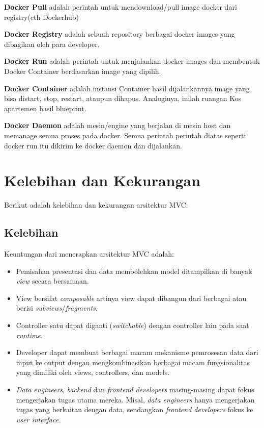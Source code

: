 \textbf{Docker Pull} adalah perintah untuk mendownload/pull image docker dari registry(cth Dockerhub)

\textbf{Docker Registry} adalah sebuah repository berbagai docker images yang dibagikan oleh para developer.

\textbf {Docker Run} adalah perintah untuk menjalankan docker images dan membentuk Docker Container berdasarkan image yang dipilih.

\textbf {Docker Container} adalah instansi Container hasil dijalankannya image yang bisa distart, stop, restart, ataupun dihapus. Analoginya, inilah ruangan Kos apartemen hasil blueprint.

\textbf {Docker Daemon} adalah mesin/engine yang berjalan di mesin host dan memanage semua proses pada docker. Semua perintah perintah diatas seperti docker run itu dikirim ke docker daemon dan dijalankan.

\section{Kelebihan dan Kekurangan}
Berikut adalah kelebihan dan kekurangan arsitektur MVC:


\subsection{Kelebihan}
Keuntungan dari menerapkan arsitektur MVC adalah:
\begin{itemize}
\item Pemisahan presentasi dan data membolehkan model ditampilkan di banyak \textit{view} secara bersamaan.
\item View bersifat \textit{composable} artinya view dapat dibangun dari berbagai atau berisi \textit{subviews}/\textit{fragments}.
\item Controller satu dapat diganti (\textit{switchable}) dengan controller lain pada saat \textit{runtime}.
\item Developer dapat membuat berbagai macam mekanisme pemrosesan data dari input ke output dengan mengkombinasikan berbagai macam fungsionalitas yang dimiliki oleh views, controllers, dan models.
\item \textit{Data engineers}, \textit{backend} dan \textit{frontend developers} masing-masing dapat fokus mengerjakan tugas utama mereka. 
Misal, \textit{data engineers} hanya mengerjakan tugas yang berkaitan dengan data, sendangkan \textit{frontend developers} fokus ke \textit{user interface}.
\end{itemize}

